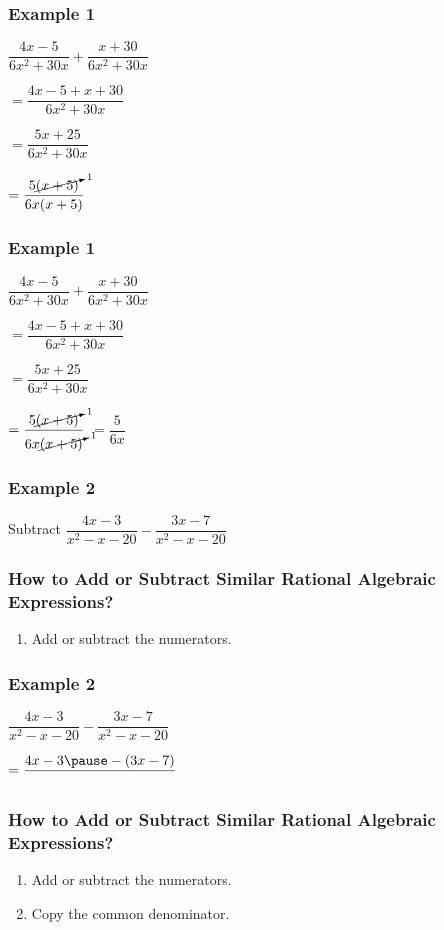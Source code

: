 \documentclass[14pt]{beamer}
\begin{document}
    \begin{frame}
    	\frametitle{Example 1}
    	$ \dfrac{4x - 5}{6x^2 + 30x} + \dfrac{x + 30}{6x^2 + 30x} $ 
    	
    	\vspace{1em} $ = \dfrac{4x - 5 + x + 30}{6x^2 + 30x} $ 
    	
    	\vspace{1em} $ = \dfrac{5x + 25 }{6x^2 + 30x} $ 
    	
    	\vspace{1em} $ = \dfrac{ 5 \cancelto{1}{(x + 5)} }{6x(x + 5)} $ 
    \end{frame}

    \begin{frame}
   	\frametitle{Example 1}
   	$ \dfrac{4x - 5}{6x^2 + 30x} + \dfrac{x + 30}{6x^2 + 30x} $ 
   	
   	\vspace{1em} $ = \dfrac{4x - 5 + x + 30}{6x^2 + 30x} $ 
   	
   	\vspace{1em} $ = \dfrac{5x + 25 }{6x^2 + 30x} $ 
   	
   	\vspace{1em} $ = \dfrac{ 5 \cancelto{1}{(x + 5)} }{6x \cancelto{1}{(x + 5)}} $ 
   	\hspace{1em}$ = \dfrac{ 5 }{6x } $ \pause \redcheck
   \end{frame}

   \begin{frame}
   	\frametitle{Example 2}
   	Subtract $ \dfrac{4x - 3}{x^2 -x - 20} - \dfrac{3x - 7}{x^2 -x - 20} $ 
   \end{frame}

    \begin{frame}
    	\frametitle{How to Add or Subtract Similar Rational Algebraic Expressions?}
    	\begin{enumerate}
    		\item Add or subtract the numerators.
    	\end{enumerate}
    \end{frame}

    \begin{frame}
    	\frametitle{Example 2}
    	$ \dfrac{4x - 3}{x^2 -x - 20} - \dfrac{3x - 7}{x^2 -x - 20} $ 
    	
    	\pause \vspace{1em} $ = \dfrac{4x - 3 \pause - (3x - 7)}{} $ 
    \end{frame}

    \begin{frame}
    	\frametitle{How to Add or Subtract Similar Rational Algebraic Expressions?}
    	\begin{enumerate}
    		\item Add or subtract the numerators.
    		\item Copy the common denominator.
    	\end{enumerate}
    \end{frame}
\end{document}
